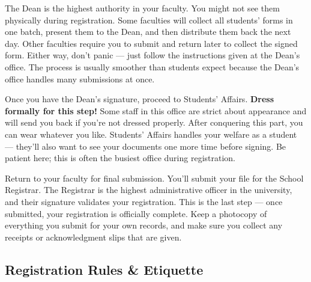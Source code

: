 \documentclass[11pt,a4paper]{article}
\begin{document}
\begin{tcolorbox}[colback=lightGray,colframe=primary,title={\color{white}\textbf{Step 4: Dean of School}},colbacktitle=primary,arc=4pt,breakable]
The Dean is the highest authority in your faculty. You might not see them physically during registration. Some faculties will collect all students' forms in one batch, present them to the Dean, and then distribute them back the next day. Other faculties require you to submit and return later to collect the signed form. Either way, don't panic --- just follow the instructions given at the Dean's office. The process is usually smoother than students expect because the Dean's office handles many submissions at once.
\end{tcolorbox}

\begin{tcolorbox}[colback=lightGray,colframe=primary,title={\color{white}\textbf{Step 5: Students' Affairs Division}},colbacktitle=primary,arc=4pt,breakable]
Once you have the Dean's signature, proceed to Students' Affairs. \textbf{Dress formally for this step!} Some staff in this office are strict about appearance and will send you back if you're not dressed properly. After conquering this part, you can wear whatever you like. Students' Affairs handles your welfare as a student --- they'll also want to see your documents one more time before signing. Be patient here; this is often the busiest office during registration.
\end{tcolorbox}

\begin{tcolorbox}[colback=lightGray,colframe=primary,title={\color{white}\textbf{Step 6: Final Submission}},colbacktitle=primary,arc=4pt,breakable]
Return to your faculty for final submission. You'll submit your file for the School Registrar. The Registrar is the highest administrative officer in the university, and their signature validates your registration. This is the last step --- once submitted, your registration is officially complete. Keep a photocopy of everything you submit for your own records, and make sure you collect any receipts or acknowledgment slips that are given.
\end{tcolorbox}

\subsection{Registration Rules \& Etiquette}
\end{document}
